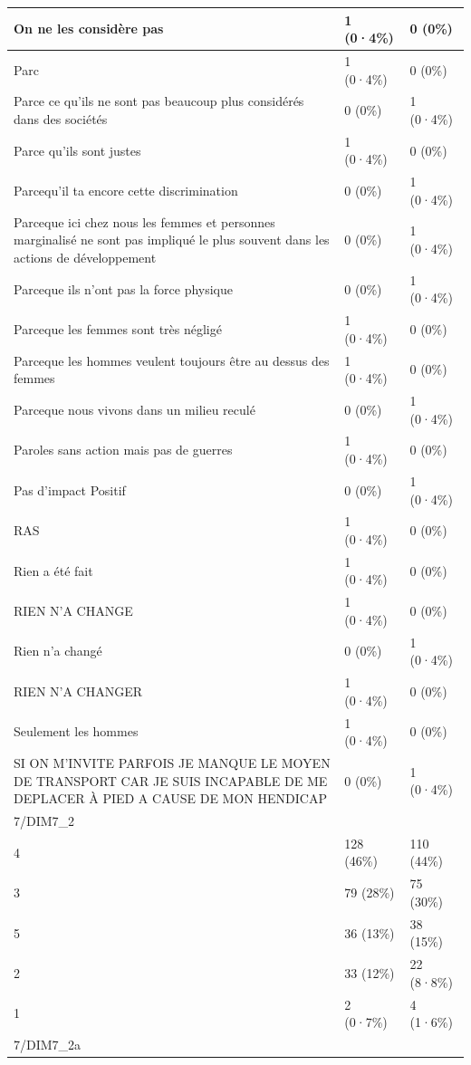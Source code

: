 \documentclass[
]{book}
\begin{document}
\begin{tabular}{l|l|l}
\hline
On ne les considère pas & 1 (0·4\%) & 0 (0\%)\\
\hline
Parc & 1 (0·4\%) & 0 (0\%)\\
\hline
Parce ce qu'ils ne sont pas beaucoup plus considérés dans des sociétés & 0 (0\%) & 1 (0·4\%)\\
\hline
Parce qu'ils sont justes & 1 (0·4\%) & 0 (0\%)\\
\hline
Parcequ'il ta encore cette discrimination & 0 (0\%) & 1 (0·4\%)\\
\hline
Parceque ici chez nous les femmes et personnes marginalisé  ne sont pas impliqué le plus souvent dans les actions de  développement & 0 (0\%) & 1 (0·4\%)\\
\hline
Parceque ils n'ont pas la force physique & 0 (0\%) & 1 (0·4\%)\\
\hline
Parceque les femmes sont très négligé & 1 (0·4\%) & 0 (0\%)\\
\hline
Parceque les hommes veulent toujours être au dessus des femmes & 1 (0·4\%) & 0 (0\%)\\
\hline
Parceque nous vivons dans un milieu reculé & 0 (0\%) & 1 (0·4\%)\\
\hline
Paroles sans action mais pas de guerres & 1 (0·4\%) & 0 (0\%)\\
\hline
Pas d'impact Positif & 0 (0\%) & 1 (0·4\%)\\
\hline
RAS & 1 (0·4\%) & 0 (0\%)\\
\hline
Rien a été fait & 1 (0·4\%) & 0 (0\%)\\
\hline
RIEN N'A CHANGE & 1 (0·4\%) & 0 (0\%)\\
\hline
Rien n'a changé & 0 (0\%) & 1 (0·4\%)\\
\hline
RIEN N'A CHANGER & 1 (0·4\%) & 0 (0\%)\\
\hline
Seulement les hommes & 1 (0·4\%) & 0 (0\%)\\
\hline
SI ON M'INVITE PARFOIS JE MANQUE LE MOYEN DE TRANSPORT CAR JE SUIS INCAPABLE DE ME DEPLACER À PIED A CAUSE DE MON HENDICAP & 0 (0\%) & 1 (0·4\%)\\
\hline
7/DIM7\_2 &  & \\
\hline
4 & 128 (46\%) & 110 (44\%)\\
\hline
3 & 79 (28\%) & 75 (30\%)\\
\hline
5 & 36 (13\%) & 38 (15\%)\\
\hline
2 & 33 (12\%) & 22 (8·8\%)\\
\hline
1 & 2 (0·7\%) & 4 (1·6\%)\\
\hline
7/DIM7\_2a &  & \\

\end{tabular}
\end{document}
